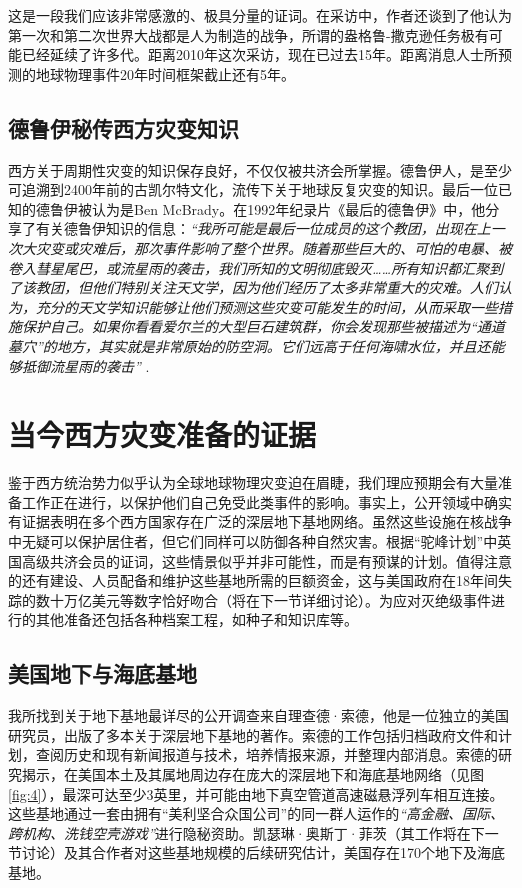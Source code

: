 \documentclass[10pt,twocolumn,letterpaper]{article}
\begin{document}
这是一段我们应该非常感激的、极具分量的证词。在采访中，作者还谈到了他认为第一次和第二次世界大战都是人为制造的战争，所谓的盎格鲁-撒克逊任务极有可能已经延续了许多代。距离2010年这次采访，现在已过去15年。距离消息人士所预测的地球物理事件20年时间框架截止还有5年。

\subsection{德鲁伊秘传西方灾变知识}

西方关于周期性灾变的知识保存良好，不仅仅被共济会所掌握。德鲁伊人，是至少可追溯到2400年前的古凯尔特文化，流传下关于地球反复灾变的知识\cite{7}。最后一位已知的德鲁伊被认为是Ben McBrady。在1992年纪录片《最后的德鲁伊》中，他分享了有关德鲁伊知识的信息：\textit{“我所可能是最后一位成员的这个教团，出现在上一次大灾变或灾难后，那次事件影响了整个世界。随着那些巨大的、可怕的电暴、被卷入彗星尾巴，或流星雨的袭击，我们所知的文明彻底毁灭……所有知识都汇聚到了该教团，但他们特别关注天文学，因为他们经历了太多非常重大的灾难。人们认为，充分的天文学知识能够让他们预测这些灾变可能发生的时间，从而采取一些措施保护自己。如果你看看爱尔兰的大型巨石建筑群，你会发现那些被描述为“通道墓穴”的地方，其实就是非常原始的防空洞。它们远高于任何海啸水位，并且还能够抵御流星雨的袭击”} \cite{8,9}.

\section{当今西方灾变准备的证据}

鉴于西方统治势力似乎认为全球地球物理灾变迫在眉睫，我们理应预期会有大量准备工作正在进行，以保护他们自己免受此类事件的影响。事实上，公开领域中确实有证据表明在多个西方国家存在广泛的深层地下基地网络。虽然这些设施在核战争中无疑可以保护居住者，但它们同样可以防御各种自然灾害。根据“驼峰计划”中英国高级共济会员的证词\cite{4,6}，这些情景似乎并非可能性，而是有预谋的计划。值得注意的还有建设、人员配备和维护这些基地所需的巨额资金，这与美国政府在18年间失踪的数十万亿美元等数字恰好吻合（将在下一节详细讨论）\cite{11,12,13}。为应对灭绝级事件进行的其他准备还包括各种档案工程，如种子和知识库等。

\subsection{美国地下与海底基地}

我所找到关于地下基地最详尽的公开调查来自理查德·索德，他是一位独立的美国研究员，出版了多本关于深层地下基地的著作\cite{22}。索德的工作包括归档政府文件和计划，查阅历史和现有新闻报道与技术，培养情报来源，并整理内部消息。索德的研究揭示，在美国本土及其属地周边存在庞大的深层地下和海底基地网络（见图\ref{fig:4}），最深可达至少3英里，并可能由地下真空管道高速磁悬浮列车相互连接。这些基地通过一套由拥有“美利坚合众国公司”的同一群人运作的\textit{“高金融、国际、跨机构、洗钱空壳游戏”}进行隐秘资助\cite{22}。凯瑟琳·奥斯丁·菲茨（其工作将在下一节讨论）及其合作者对这些基地规模的后续研究估计，美国存在170个地下及海底基地\cite{16,20}。
\end{document}
